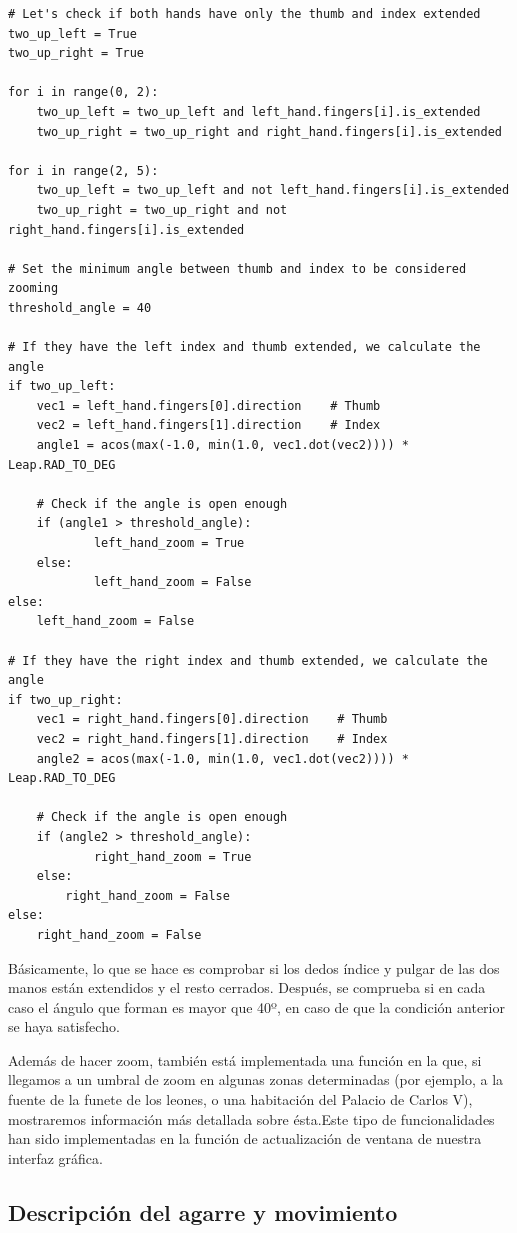 \documentclass[11pt,a4paper]{article}
\begin{document}
\begin{lstlisting}
# Let's check if both hands have only the thumb and index extended
two_up_left = True
two_up_right = True

for i in range(0, 2):
	two_up_left = two_up_left and left_hand.fingers[i].is_extended
    two_up_right = two_up_right and right_hand.fingers[i].is_extended

for i in range(2, 5):
	two_up_left = two_up_left and not left_hand.fingers[i].is_extended
    two_up_right = two_up_right and not right_hand.fingers[i].is_extended

# Set the minimum angle between thumb and index to be considered zooming
threshold_angle = 40

# If they have the left index and thumb extended, we calculate the angle
if two_up_left:
	vec1 = left_hand.fingers[0].direction    # Thumb
	vec2 = left_hand.fingers[1].direction    # Index
    angle1 = acos(max(-1.0, min(1.0, vec1.dot(vec2)))) * Leap.RAD_TO_DEG

    # Check if the angle is open enough
    if (angle1 > threshold_angle):
    		left_hand_zoom = True
	else:
    		left_hand_zoom = False
else:
	left_hand_zoom = False

# If they have the right index and thumb extended, we calculate the angle
if two_up_right:
	vec1 = right_hand.fingers[0].direction    # Thumb
    vec2 = right_hand.fingers[1].direction    # Index
    angle2 = acos(max(-1.0, min(1.0, vec1.dot(vec2)))) * Leap.RAD_TO_DEG

    # Check if the angle is open enough
    if (angle2 > threshold_angle):
    		right_hand_zoom = True
	else:
		right_hand_zoom = False
else:
	right_hand_zoom = False
\end{lstlisting}

Básicamente, lo que se hace es comprobar si los dedos índice y pulgar de las dos
manos están extendidos y el resto cerrados. Después, se comprueba si en cada
caso el ángulo que forman es mayor que 40º, en caso de que la condición anterior
se haya satisfecho.

Además de hacer zoom, también está implementada una función en la que, si llegamos a un umbral de zoom en algunas zonas determinadas (por ejemplo,
a la fuente de la funete de los leones, o una habitación del Palacio de Carlos V), mostraremos información más detallada sobre ésta.Este tipo de funcionalidades han sido implementadas en la función de actualización de ventana de nuestra interfaz gráfica.


\subsection{Descripción del agarre y movimiento}
\end{document}
